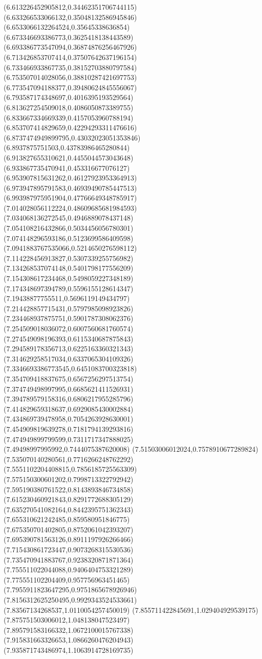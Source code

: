 {(6.613226452905812,0.34462351706744115)
(6.633266533066132,0.35048132586945846)
(6.6533066132264524,0.35645338636854)
(6.673346693386773,0.3625418138443589)
(6.693386773547094,0.36874876256467926)
(6.713426853707414,0.37507642637196154)
(6.733466933867735,0.38152703880797584)
(6.753507014028056,0.38810287421697753)
(6.773547094188377,0.39480624845556067)
(6.793587174348697,0.4016395193529564)
(6.813627254509018,0.4086050873389755)
(6.833667334669339,0.4157053960788194)
(6.853707414829659,0.42294293311476616)
(6.8737474949899795,0.43032023051353846)
(6.8937875751503,0.43783986465280844)
(6.913827655310621,0.4455044573043648)
(6.933867735470941,0.453316677076127)
(6.953907815631262,0.46127923953364913)
(6.973947895791583,0.46939490785447513)
(6.993987975951904,0.47766649348785917)
(7.014028056112224,0.48609685681984593)
(7.034068136272545,0.4946889078437148)
(7.054108216432866,0.5034456056780301)
(7.074148296593186,0.5123699586409598)
(7.0941883767535066,0.5214650276598112)
(7.114228456913827,0.5307339255756982)
(7.134268537074148,0.5401798177556209)
(7.154308617234468,0.5498059227348189)
(7.174348697394789,0.5596155128614347)
(7.19438877755511,0.5696119149434797)
(7.214428857715431,0.5797985098923826)
(7.234468937875751,0.5901787308062376)
(7.254509018036072,0.6007560681760574)
(7.274549098196393,0.6115340687875843)
(7.294589178356713,0.6225163360321343)
(7.314629258517034,0.6337065304109326)
(7.3346693386773545,0.6451083700323818)
(7.354709418837675,0.6567256297513754)
(7.374749498997995,0.6685621411526931)
(7.394789579158316,0.6806217955285796)
(7.414829659318637,0.6929085430002884)
(7.434869739478958,0.7054263928630001)
(7.454909819639278,0.7181794139293816)
(7.474949899799599,0.7311717347888025)
(7.49498997995992,0.7444075387620008)
(7.51503006012024,0.7578910677289824)
(7.535070140280561,0.7716266248762292)
(7.5551102204408815,0.7856185725563309)
(7.575150300601202,0.7998713322792942)
(7.595190380761522,0.8143893846734858)
(7.615230460921843,0.8291772688305129)
(7.635270541082164,0.8442395751362343)
(7.655310621242485,0.859580951846775)
(7.675350701402805,0.8752061042393207)
(7.695390781563126,0.8911197926266466)
(7.715430861723447,0.9073268315530536)
(7.735470941883767,0.9238320871871364)
(7.755511022044088,0.9406404753321289)
(7.775551102204409,0.957756963451465)
(7.7955911823647295,0.9751865678926946)
(7.8156312625250495,0.9929343524533661)
(7.83567134268537,1.0110054257450019)
(7.855711422845691,1.029404929539175)
(7.875751503006012,1.048138047523497)
(7.895791583166332,1.0672100015767338)
(7.915831663326653,1.0866260476204943)
(7.935871743486974,1.1063914728169735)
}
